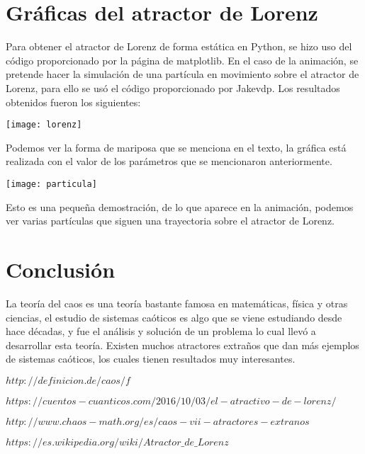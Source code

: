 \documentclass[12pt]{article}
\begin{document}
\begin{doublespace}
\section{Gráficas del atractor de Lorenz}
Para obtener el atractor de Lorenz de forma estática en Python, se hizo uso del código proporcionado por la página de matplotlib. En el caso de la animación, se pretende hacer la simulación de una partícula en movimiento sobre el atractor de Lorenz, para ello se usó el código proporcionado por Jakevdp. Los resultados obtenidos fueron los siguientes:

\begin{center}
\texttt{[image: lorenz]}
\end{center}

Podemos ver la forma de mariposa que se menciona en el texto, la gráfica está realizada con el valor de los parámetros que se mencionaron anteriormente. 

\begin{center}
\texttt{[image: particula]}
\end{center}

Esto es una pequeña demostración, de lo que aparece en la animación, podemos ver varias partículas que siguen una trayectoria sobre el atractor de Lorenz.

\section{Conclusión}
La teoría del caos es una teoría bastante famosa en matemáticas, física y otras ciencias, el estudio de sistemas caóticos es algo que se viene estudiando desde hace décadas, y fue el análisis y solución de un problema lo cual llevó a desarrollar esta teoría. Existen muchos atractores extraños que dan más ejemplos de sistemas caóticos, los cuales tienen resultados muy interesantes.

\newpage
\renewcommand{\refname}{\section{Referencias}}
\begin{thebibliography}{9}
 \textsc{$http://definicion.de/caos/f$}

 \textsc{$https://cuentos-cuanticos.com/2016/10/03/el-atractivo-de-lorenz/$}

 \textsc{$http://www.chaos-math.org/es/caos-vii-atractores-extranos$}

 \textsc{$https://es.wikipedia.org/wiki/Atractor\_de\_Lorenz$}


\end{thebibliography}
\end{doublespace}
\end{document}
